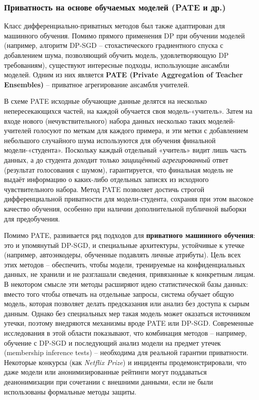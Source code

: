 \subsubsection{Приватность на основе обучаемых моделей (PATE и др.)}

Класс дифференциально-приватных методов был также адаптирован для машинного обучения. Помимо прямого применения DP при
обучении моделей (например, алгоритм DP-SGD – стохастического градиентного спуска с добавлением шума, позволяющий
обучить модель, удовлетворяющую DP требованиям), существуют интересные подходы, использующие ансамбли моделей. Одним из
них является \textbf{PATE (Private Aggregation of Teacher Ensembles)} \autocite{papernot2017pate} – приватное агрегирование ансамбля учителей.

В схеме PATE исходные обучающие данные делятся на несколько непересекающихся частей, на каждой обучается своя
модель-«учитель». Затем на входе нового (нечувствительного) набора данных несколько таких моделей-учителей голосуют по
меткам для каждого примера, и эти метки с добавлением небольшого случайного шума используются для обучения финальной
модели-«студента». Поскольку каждый отдельный «учитель» видит лишь часть данных, а до студента доходит только
\textit{защищённый агрегированный} ответ (результат голосования с шумом), гарантируется, что финальная модель не выдаёт
информацию о каких-либо отдельных записях из исходного чувствительного набора. Метод PATE позволяет достичь строгой
дифференциальной приватности для модели-студента, сохраняя при этом высокое качество обучения, особенно при наличии
дополнительной публичной выборки для предобучения.

Помимо PATE, развивается ряд подходов для \textbf{приватного
машинного обучения}: это и упомянутый DP-SGD, и специальные архитектуры, устойчивые к утечке (например, автоэнкодеры,
обученные подавлять личные атрибуты). Цель всех этих методов – обеспечить, чтобы модели, тренируемые на конфиденциальных
данных, не хранили и не разглашали сведения, привязанные к конкретным лицам. В некотором смысле эти методы расширяют
идею статистической базы данных: вместо того чтобы отвечать на отдельные запросы, система обучает общую модель, которая
позволяет делать предсказания или анализ без доступа к сырым данным. Однако без специальных мер такая модель может
оказаться источником утечки, поэтому внедряются механизмы вроде PATE или DP-SGD. Современные исследования в этой области
показывают, что комбинация методов – например, обучение с DP-SGD и последующий анализ модели на предмет утечек
(membership inference tests) – необходима для реальной гарантии приватности. Некоторые конкурсы (как \textit{Netflix
Prize}) и инциденты продемонстрировали, что даже модели или анонимизированные рейтинги могут поддаваться деанонимизации
при сочетании с внешними данными, если не были использованы формальные методы защиты.


